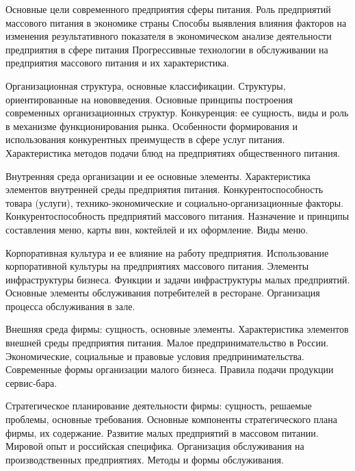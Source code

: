 \documentclass[
	11pt,
	a4paper,
	]
	{article}
\begin{document}
\bigskip

\noindent{} 
	{
		Основные цели современного предприятия сферы питания. Роль предприятий массового питания в экономике страны
	}{
		Способы выявления влияния факторов на изменения результативного показателя в экономическом анализе деятельности предприятия в сфере питания
	}{
		Прогрессивные технологии в обслуживании на предприятия массового питания и их характеристика.
	}

\bigskip

\noindent{} 
	{
		Организационная структура, основные классификации. Структуры, ориентированные на нововведения. Основные принципы построения современных организационных структур.
	}{
		Конкуренция: ее сущность, виды и роль в механизме функционирования рынка. Особенности формирования и использования конкурентных преимуществ в сфере услуг питания.
	}{
		Характеристика методов подачи блюд на предприятиях общественного питания.
	}

\bigskip

\noindent{} 
	{
		Внутренняя среда организации и ее основные элементы. Характеристика элементов внутренней среды предприятия питания.
	}{
		Конкурентоспособность товара (услуги), технико-экономические и социально-организационные факторы. Конкурентоспособность предприятий массового питания.
	}{
		Назначение и принципы составления меню, карты вин, коктейлей и их оформление. Виды меню.
	}

\bigskip

\noindent{} 
	{
		Корпоративная культура и ее влияние на работу предприятия. Использование корпоративной культуры на предприятиях массового питания.
	}{
		Элементы инфраструктуры бизнеса. Функции и задачи инфраструктуры малых предприятий.
	}{
		Основные элементы обслуживания потребителей в ресторане. Организация процесса обслуживания в зале.
	}

\bigskip

\noindent{} 
	{
		Внешняя среда фирмы: сущность, основные элементы. Характеристика элементов внешней среды предприятия питания.
	}{
		Малое предпринимательство в России. Экономические, социальные и правовые условия предпринимательства. Современные формы организации малого бизнеса.
	}{
		Правила подачи продукции сервис-бара.
	}

\bigskip

\noindent{} 
	{
		Стратегическое планирование деятельности фирмы: сущность, решаемые проблемы, основные требования. Основные компоненты стратегического плана фирмы, их содержание.
	}{
		Развитие малых предприятий в массовом питании. Мировой опыт и российская специфика.
	}{
		Организация обслуживания на производственных предприятиях. Методы и формы обслуживания.
	}
\end{document}
